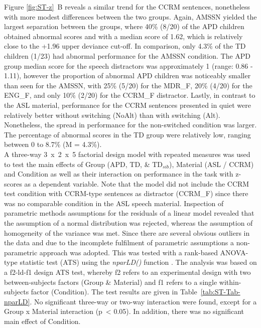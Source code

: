 \documentclass[a4paper, twoside]{templates/ociamthesis}
\begin{document}
\hfill\break
Figure \ref{fig:ST-z}~B reveals a similar trend for the CCRM sentences, nonetheless with more modest differences between the two groups. Again, AMSSN yielded the largest separation between the groups, where 40\% (8/20) of the APD children obtained abnormal scores and with a median score of 1.62, which is relatively close to the +1.96 upper deviance cut-off. In comparison, only 4.3\% of the TD children (1/23) had abnormal performance for the AMSSN condition. The APD group median score for the speech distractors was approximately 1 (range: 0.86 - 1.11), however the proportion of abnormal APD children was noticeably smaller than seen for the AMSSN, with 25\% (5/20) for the MDR\_F, 20\% (4/20) for the ENG\_F, and only 10\% (2/20) for the CCRM\_F distractor. Lastly, in contrast to the ASL material, performance for the CCRM sentences presented in quiet were relatively better without switching (NoAlt) than with switching (Alt). Nonetheless, the spread in performance for the non-switched condition was larger. The percentage of abnormal scores in the TD group were relatively low, ranging between 0 to 8.7\% (M = 4.3\%).\\

A three-way 3~x~2~x~5 factorial design model with repeated measures was used to test the main effects of Group (APD, TD, \& TD\(_{sib}\)), Material (ASL / CCRM) and Condition as well as their interaction on performance in the task with z-scores as a dependent variable. Note that the model did not include the CCRM test condition with CCRM-type sentences as distractor (CCRM\_F) since there was no comparable condition in the ASL speech material. Inspection of parametric methods assumptions for the residuals of a linear model revealed that the assumption of a normal distribution was rejected, whereas the assumption of homogeneity of the variance was met. Since there are several obvious outliers in the data and due to the incomplete fulfilment of parametric assumptions a non-parametric approach was adopted. This was tested with a rank-based ANOVA-type statistic test (ATS) using the \emph{nparLD()} function \autocite[nparLD package;][]{nparLDPackageR}. The analysis was based on a f2-ld-f1 design ATS test, whereby f2 refers to an experimental design with two between-subjects factors (Group \& Material) and f1 refers to a single within-subjects factor (Condition). The test results are given in Table~\ref{tab:ST-Tab-nparLD}. No significant three-way or two-way interaction were found, except for a Group x Material interaction (p~\textless{} 0.05). In addition, there was no significant main effect of Condition.\\
\end{document}
